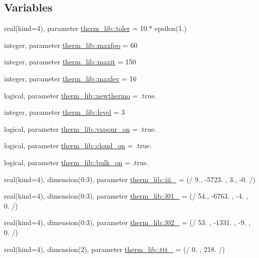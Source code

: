 \subsection*{Variables}
\begin{DoxyCompactItemize}
\item 
real(kind=4), parameter \hyperlink{namespacetherm__lib_a4855f01e51a3fcf9e35d4f7d17156819}{therm\+\_\+lib\+::toler} = 10.$\ast$ epsilon(1.)
\item 
integer, parameter \hyperlink{namespacetherm__lib_a726eec5f615e82a7ab9542aad323ff6b}{therm\+\_\+lib\+::maxfpo} = 60
\item 
integer, parameter \hyperlink{namespacetherm__lib_af55ed6ff22d96d8e9778f1b9711a5f29}{therm\+\_\+lib\+::maxit} = 150
\item 
integer, parameter \hyperlink{namespacetherm__lib_a4369cbefc67fc26498b97b24ca760dcd}{therm\+\_\+lib\+::maxlev} = 16
\item 
logical, parameter \hyperlink{namespacetherm__lib_ac36c121987554589b16d515ddc351939}{therm\+\_\+lib\+::newthermo} = .true.
\item 
integer, parameter \hyperlink{namespacetherm__lib_ace5c9fdd5940d4602568d9d3df5c930f}{therm\+\_\+lib\+::level} = 3
\item 
logical, parameter \hyperlink{namespacetherm__lib_a7c4a4113d6d2548dd389c9eefce0396e}{therm\+\_\+lib\+::vapour\+\_\+on} = .true.
\item 
logical, parameter \hyperlink{namespacetherm__lib_a7761745573e57bcf109498771693bc48}{therm\+\_\+lib\+::cloud\+\_\+on} = .true.
\item 
logical, parameter \hyperlink{namespacetherm__lib_a74e34c886f54fe2ca038c4f301d31beb}{therm\+\_\+lib\+::bulk\+\_\+on} = .true.
\item 
real(kind=4), dimension(0\+:3), parameter \hyperlink{namespacetherm__lib_af62776bc58906738f54b9b6be6b672d6}{therm\+\_\+lib\+::iii\+\_} = (/ 9., -\/5723. , 3., -\/0. /)
\item 
real(kind=4), dimension(0\+:3), parameter \hyperlink{namespacetherm__lib_a32ef1fd4d35773be9ba1f5a7dbc13b6e}{therm\+\_\+lib\+::l01\+\_} = (/ 54., -\/6763. , -\/4. , 0. /)
\item 
real(kind=4), dimension(0\+:3), parameter \hyperlink{namespacetherm__lib_adaf6c70605ef5072ebc0a71bb1189d99}{therm\+\_\+lib\+::l02\+\_} = (/ 53. , -\/1331. , -\/9. , 0. /)
\item 
real(kind=4), dimension(2), parameter \hyperlink{namespacetherm__lib_afb689f706983009dfc62f3f4d0f85dc7}{therm\+\_\+lib\+::ttt\+\_} = (/ 0. , 218. /)

\end{DoxyCompactItemize}
